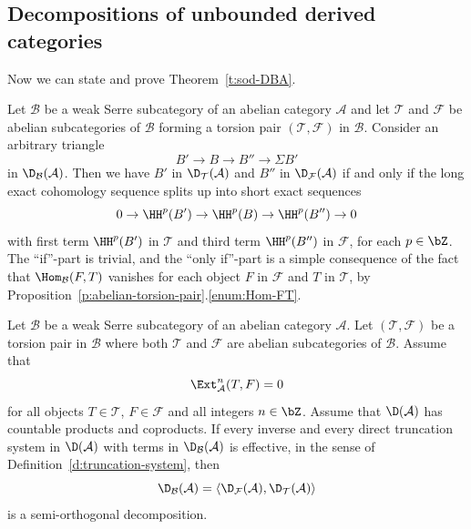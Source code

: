 \subsection{Decompositions of unbounded derived categories}
\label{sec:decomp-unbo-deriv}

Now we can state and prove Theorem~\ref{t:sod-DBA}.

\begin{remark}
\label{rem:cohomology-split}
Let $\mathcal{B}$ be a weak Serre subcategory of an abelian
category $\mathcal{A}$
and let $\mathcal{T}$ and $\mathcal{F}$ be abelian subcategories of
$\mathcal{B}$ forming a torsion pair $(\mathcal{T}, \mathcal{F})$ in
$\mathcal{B}$.
Consider an arbitrary triangle
\begin{equation*}
  B' \to B \to B'' \to \Sigma B'
\end{equation*}
in $\D_\mathcal{B}(\mathcal{A})$.
Then we have $B'$ in $\D_\mathcal{T}(\mathcal{A})$
and $B''$ in $\D_\mathcal{F}(\mathcal{A})$
if and only if the long exact cohomology sequence splits up
into short exact sequences
\begin{equation*}
  0 \to \HH^p(B')
  \to \HH^p(B)
  \to \HH^p(B'')
  \to 0
\end{equation*}
with first term $\HH^p(B')$ in $\mathcal{T}$ and third term
$\HH^p(B'')$ in
$\mathcal{F}$, for each $p \in \bZ$. The ``if''-part is trivial,
and the ``only if''-part
is a simple consequence of the fact that $\Hom_\mathcal{B}(F, T)$
vanishes for each object $F$ in $\mathcal{F}$ and $T$
in $\mathcal{T}$, by 
Proposition~\ref{p:abelian-torsion-pair}.\ref{enum:Hom-FT}.
\end{remark}

\begin{theorem}
  \label{t:sod-DBA}
  Let $\mathcal{B}$ be a weak Serre subcategory of an abelian
  category $\mathcal{A}$.
  Let $(\mathcal{T}, \mathcal{F})$ be a torsion pair in
  $\mathcal{B}$ where both $\mathcal{T}$ and
  $\mathcal{F}$ are abelian subcategories of $\mathcal{B}$.
  Assume that 
  \begin{equation*}
    \Ext_\mathcal{A}^n(T, F)=0
  \end{equation*}
  for all objects $T \in \mathcal{T}$, $F \in \mathcal{F}$ and
  all integers $n \in \bZ$. 
  Assume that $\D(\mathcal{A})$ has countable products and
  coproducts. 
  If every inverse and every direct truncation
  system in 
  $\D(\mathcal{A})$ with terms in $\D_\mathcal{B}(\mathcal{A})$
  is effective, 
  in the sense of Definition~\ref{d:truncation-system},
  then 
  \begin{equation*}
    \D_{\mathcal{B}}(\mathcal{A})=
    \langle \D_{\mathcal{F}}(\mathcal{A}), 
    \D_{\mathcal{T}}(\mathcal{A})\rangle
  \end{equation*}
  is a semi-orthogonal decomposition.
\end{theorem}

